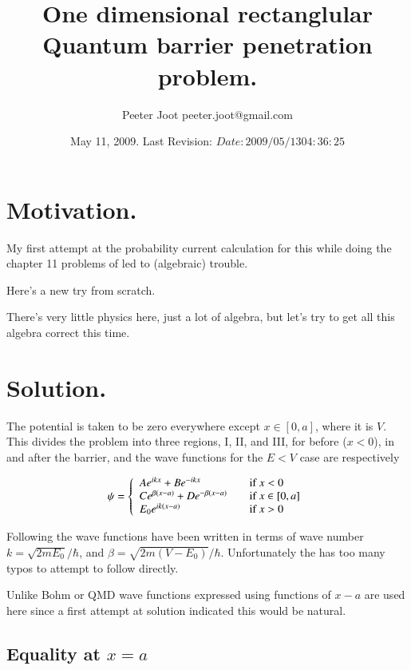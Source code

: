 \documentclass{article}
\title{ One dimensional rectanglular Quantum barrier penetration problem. }
\author{Peeter Joot \quad peeter.joot@gmail.com }
\date{ May 11, 2009.  Last Revision: $Date: 2009/05/13 04:36:25 $ }
\begin{document}
\maketitle{}
\tableofcontents
\section{ Motivation. }

My first attempt at the probability current calculation for this
while doing the chapter 11 problems of \cite{bohm1989qt} led to (algebraic) trouble.

Here's a new try from scratch.

There's very little physics here, just a lot of algebra, but let's try
to get all this algebra correct this time.

\section{ Solution. }

The potential is taken to be zero everywhere except $x \in [0,a]$, where it is
$V$.  This divides the problem into three regions, I, II, and III, for 
before ($x<0$), in and after the barrier, and the wave functions for the 
$E <V$ case are respectively

\begin{equation}
\psi =
\left\{
\begin{array}{l l}
A e^{i k x} + B e^{-i k x} & \quad \mbox{if $x <0$} \\
C e^{ \beta(x-a)} + D e^{ -\beta(x-a)} & \quad \mbox{if $x \in [0,a]$} \\
E_0 e^{i k(x-a)} & \quad \mbox{if $x >0$} \\
\end{array}
\right.
\end{equation}

Following \cite{mcmahon2005qmd} the wave functions have been written in terms of wave number 
$k = \sqrt{2 m E_0}/\hbar$, and $\beta = \sqrt{2 m (V-E_0)}/\hbar$.  Unfortunately the 
\cite{mcmahon2005qmd} has too many typos to attempt to follow directly.

Unlike Bohm or QMD wave functions expressed using functions of $x-a$ are used here since a first
attempt at solution indicated this would be natural.

\subsection{ Equality at $x=a$ }
\end{document}
